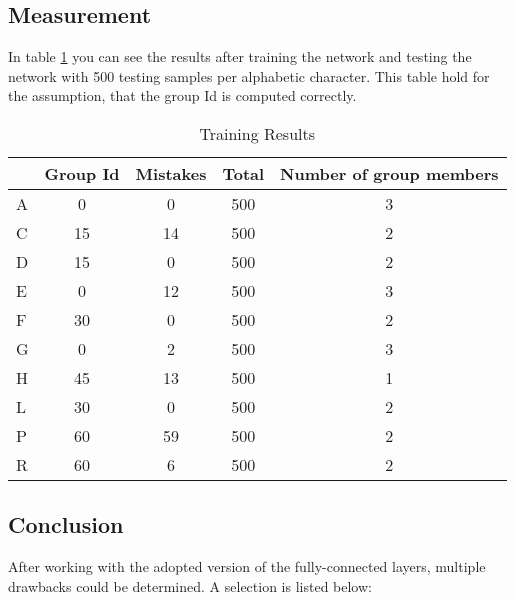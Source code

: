\subsection{Measurement}
In table \ref{table:part3Results} you can see the results after training the network and testing the network with 500 testing samples per alphabetic character. This table hold for the assumption, that the group Id is computed correctly. \\

\begin{table}[htbp]
\caption{Training Results}
\centering
\begin{tabular}{l|c|cc|c}
       ~            & Group Id & Mistakes & Total & Number of group members  \\
    \midrule                                     
    A     & 0 & 0  & 500 & 3  \\
    C     & 15 & 14 & 500 & 2  \\
    D     & 15 & 0 & 500 & 2  \\
    E     & 0 & 12  & 500 & 3  \\
    F     & 30 & 0 & 500 & 2  \\
    G     & 0 & 2  & 500 & 3  \\
    H     & 45 & 13 & 500 & 1 \\
    L     & 30 & 0 & 500 & 2   \\
    P     & 60 & 59 & 500 & 2  \\
    R     & 60 & 6 & 500 & 2  \\

\end{tabular}
\label{table:part3Results}
\end{table}

\subsection{Conclusion}
After working with the adopted version of the fully-connected layers, multiple drawbacks could be determined. A selection is listed below:

